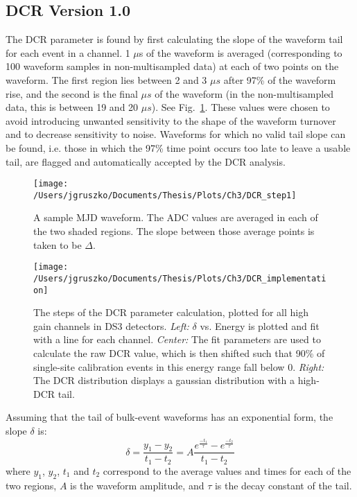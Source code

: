 \subsection{DCR Version 1.0}
The DCR parameter is found by first calculating the slope of the waveform tail for each event in a channel. 1 $\mu$s of the waveform is averaged (corresponding to 100 waveform samples in non-multisampled data) at each of two points on the waveform. The first region lies between 2 and 3 $\mu s$ after 97\% of the waveform rise, and the second is the final $\mu s$ of the waveform (in the non-multisampled data, this is between 19 and 20 $\mu s$). See Fig.~\ref{fig:DCR_step1}. These values were chosen to avoid introducing unwanted sensitivity to the shape of the waveform turnover and to decrease sensitivity to noise. Waveforms for which no valid tail slope can be found, i.e. those in which the 97\% time point occurs too late to leave a usable tail, are flagged and automatically accepted by the DCR analysis. 

\begin{figure}[h]
 \centering
 \texttt{[image: /Users/jgruszko/Documents/Thesis/Plots/Ch3/DCR\_step1]}
 \caption[A sample MJD waveform, with indicated tail slope measurement points]{A sample MJD waveform. The ADC values are averaged in each of the two shaded regions. The slope between those average points is taken to be $\Delta$.} 
 \label{fig:DCR_step1}
\end{figure}

\begin{figure*}[t]
 \centering
 \texttt{[image: /Users/jgruszko/Documents/Thesis/Plots/Ch3/DCR\_implementation]}
 \caption[The steps of the DCR parameter calculation]{The steps of the DCR parameter calculation, plotted for all high gain channels in DS3 detectors. {\it Left:} $\delta$ vs. Energy is plotted and fit with a line for each channel. {\it Center:} The fit parameters are used to calculate the raw DCR value, which is then shifted such that 90\% of single-site calibration events in this energy range fall below 0. {\it Right:} The DCR distribution displays a gaussian distribution with a high-DCR tail.} 
 \label{fig:DCR_implementation}
\end{figure*}

Assuming that the tail of bulk-event waveforms has an exponential form, the slope $\delta$ is:
$$\delta = \frac{y_1 - y_2}{t_1-t_2} = A\frac{e^{\frac{-t_1}{\tau}}-e^{\frac{-t_2}{\tau}}}{t_1-t_2} $$
where $y_1$, $y_2$, $t_1$ and $t_2$ correspond to the average values and times for each of the two regions, $A$ is the waveform amplitude, and $\tau$ is the decay constant of the tail. 


